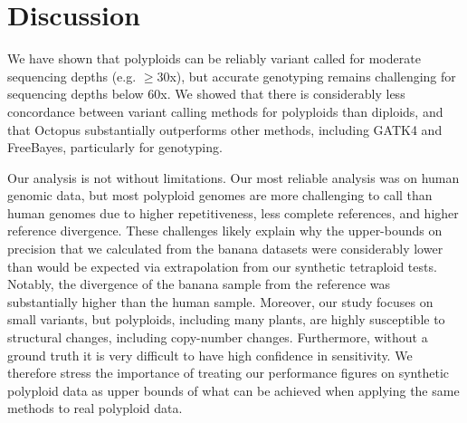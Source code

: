 \documentclass[notitlepage, twocolumn, 10pt]{article}
\begin{document}
\begin{table}[tp]
%
\end{table}

\section*{Discussion}

We have shown that polyploids can be reliably variant called for moderate sequencing depths (e.g. $\ge30$x), but accurate genotyping remains challenging for sequencing depths below $60$x. We showed that there is considerably less concordance between variant calling methods for polyploids than diploids, and that Octopus substantially outperforms other methods, including GATK4 and FreeBayes, particularly for genotyping.

Our analysis is not without limitations. Our most reliable analysis was on human genomic data, but most polyploid genomes are more challenging to call than human genomes due to higher repetitiveness, less complete references, and higher reference divergence. These challenges likely explain why the upper-bounds on precision that we calculated from the banana datasets were considerably lower than would be expected via extrapolation from our synthetic tetraploid tests. Notably, the divergence of the banana sample from the reference was substantially higher than the human sample. Moreover, our study focuses on small variants, but polyploids, including many plants, are highly susceptible to structural changes, including copy-number changes. Furthermore, without a  ground truth it is very difficult to have high confidence in sensitivity. We therefore stress the importance of treating our performance figures on synthetic polyploid data as upper bounds of what can be achieved when applying the same methods to real polyploid data.
\end{document}
